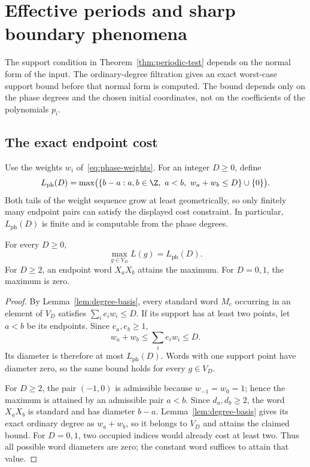 \section{Effective periods and sharp boundary phenomena}
\label{sec:effective-periods}

The support condition in Theorem~\ref{thm:periodic-test} depends on the
normal form of the input.  The ordinary-degree filtration gives an exact
worst-case support bound before that normal form is computed.  The bound
depends only on the phase degrees and the chosen initial coordinates,
not on the coefficients of the polynomials $p_i$.

\subsection{The exact endpoint cost}

Use the weights $w_i$ of~\eqref{eq:phase-weights}.  For an integer
$D\ge0$, define
\[
 L_{\mathrm{ph}}(D)
 =\max\bigl(\{b-a:a,b\in\Z,\ a<b,\ w_a+w_b\le D\}\cup\{0\}\bigr).
\]
Both tails of the weight sequence grow at least geometrically, so only
finitely many endpoint pairs can satisfy the displayed cost constraint.
In particular, $L_{\mathrm{ph}}(D)$ is finite and is computable from
the phase degrees.

\begin{proposition}\label{prop:exact-span}
For every $D\ge0$,
\[
 \max_{g\in V_D}L(g)=L_{\mathrm{ph}}(D).
\]
For $D\ge2$, an endpoint word $X_aX_b$ attains the maximum.
For $D=0,1$, the maximum is zero.
\end{proposition}

\begin{proof}
By Lemma~\ref{lem:degree-basis}, every standard word $M_e$ occurring
in an element of $V_D$ satisfies $\sum_i e_iw_i\le D$.
If its support has at least two points, let $a<b$ be its endpoints.
Since $e_a,e_b\ge1$,
\[
 w_a+w_b\le\sum_i e_iw_i\le D.
\]
Its diameter is therefore at most $L_{\mathrm{ph}}(D)$.
Words with one support point have diameter zero, so the same bound
holds for every $g\in V_D$.

For $D\ge2$, the pair $(-1,0)$ is admissible because
$w_{-1}=w_0=1$; hence the maximum is attained by an admissible pair
$a<b$.  Since $d_a,d_b\ge2$, the word $X_aX_b$ is standard and
has diameter $b-a$.  Lemma~\ref{lem:degree-basis} gives its exact
ordinary degree as $w_a+w_b$, so it belongs to $V_D$ and attains
the claimed bound.  For $D=0,1$, two occupied indices would already
cost at least two.  Thus all possible word diameters are zero;
the constant word suffices to attain that value.
\end{proof}


